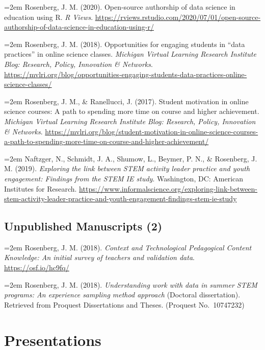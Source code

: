 \documentclass[
  14,
]{article}
\begin{document}
\hangindent=2em Rosenberg, J. M. (2020). Open-source authorship of data
science in education using R. \emph{R Views}.
\url{https://rviews.rstudio.com/2020/07/01/open-source-authorship-of-data-science-in-education-using-r/}

\hangindent=2em Rosenberg, J. M. (2018). Opportunities for engaging
students in ``data practices'' in online science classes. \emph{Michigan
Virtual Learning Research Institute Blog: Research, Policy, Innovation
\& Networks}.
\url{https://mvlri.org/blog/opportunities-engaging-students-data-practices-online-science-classes/}

\hangindent=2em Rosenberg, J. M., \& Ranellucci, J. (2017). Student
motivation in online science courses: A path to spending more time on
course and higher achievement. \emph{Michigan Virtual Learning Research
Institute Blog: Research, Policy, Innovation \& Networks}.
\url{https://mvlri.org/blog/student-motivation-in-online-science-courses-a-path-to-spending-more-time-on-course-and-higher-achievement/}

\hangindent=2em Naftzger, N., Schmidt, J. A., Shumow, L., Beymer, P. N.,
\& Rosenberg, J. M. (2019). \emph{Exploring the link between STEM
activity leader practice and youth engagement: Findings from the STEM IE
study}. Washington, DC: American Institutes for Research.
\url{https://www.informalscience.org/exploring-link-between-stem-activity-leader-practice-and-youth-engagement-findings-stem-ie-study}

\hypertarget{unpublished-manuscripts-2}{%
\subsection{Unpublished Manuscripts
(2)}\label{unpublished-manuscripts-2}}

\hangindent=2em Rosenberg, J. M. (2018). \emph{Context and Technological
Pedagogical Content Knowledge: An initial survey of teachers and
validation data}. \url{https://osf.io/hc9fq/}

\hangindent=2em Rosenberg, J. M. (2018). \emph{Understanding work with
data in summer STEM programs: An experience sampling method approach}
(Doctoral dissertation). Retrieved from Proquest Dissertations and
Theses. (Proquest No.~10747232)

\hypertarget{presentations}{%
\section{Presentations}\label{presentations}}
\end{document}
